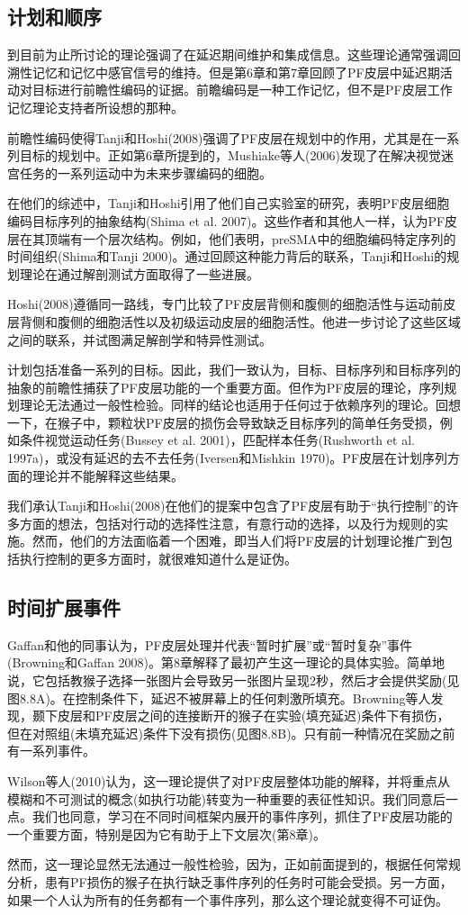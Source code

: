 \subsection{计划和顺序}
到目前为止所讨论的理论强调了在延迟期间维护和集成信息。这些理论通常强调回溯性记忆和记忆中感官信号的维持。但是第6章和第7章回顾了PF皮层中延迟期活动对目标进行前瞻性编码的证据。前瞻编码是一种工作记忆，但不是PF皮层工作记忆理论支持者所设想的那种。
\par 
前瞻性编码使得Tanji和Hoshi(2008)强调了PF皮层在规划中的作用，尤其是在一系列目标的规划中。正如第6章所提到的，Mushiake等人(2006)发现了在解决视觉迷宫任务的一系列运动中为未来步骤编码的细胞。
\par 
在他们的综述中，Tanji和Hoshi引用了他们自己实验室的研究，表明PF皮层细胞编码目标序列的抽象结构(Shima et al. 2007)。这些作者和其他人一样，认为PF皮层在其顶端有一个层次结构。例如，他们表明，preSMA中的细胞编码特定序列的时间组织(Shima和Tanji 2000)。通过回顾这种能力背后的联系，Tanji和Hoshi的规划理论在通过解剖测试方面取得了一些进展。
\par 
Hoshi(2008)遵循同一路线，专门比较了PF皮层背侧和腹侧的细胞活性与运动前皮层背侧和腹侧的细胞活性以及初级运动皮层的细胞活性。他进一步讨论了这些区域之间的联系，并试图满足解剖学和特异性测试。
\par 
计划包括准备一系列的目标。因此，我们一致认为，目标、目标序列和目标序列的抽象的前瞻性捕获了PF皮层功能的一个重要方面。但作为PF皮层的理论，序列规划理论无法通过一般性检验。同样的结论也适用于任何过于依赖序列的理论。回想一下，在猴子中，颗粒状PF皮层的损伤会导致缺乏目标序列的简单任务受损，例如条件视觉运动任务(Bussey et al. 2001)，匹配样本任务(Rushworth et al. 1997a)，或没有延迟的去不去任务(Iversen和Mishkin 1970)。PF皮层在计划序列方面的理论并不能解释这些结果。
\par 
我们承认Tanji和Hoshi(2008)在他们的提案中包含了PF皮层有助于“执行控制”的许多方面的想法，包括对行动的选择性注意，有意行动的选择，以及行为规则的实施。然而，他们的方法面临着一个困难，即当人们将PF皮层的计划理论推广到包括执行控制的更多方面时，就很难知道什么是证伪。
\subsection{时间扩展事件}
Gaffan和他的同事认为，PF皮层处理并代表“暂时扩展”或“暂时复杂”事件(Browning和Gaffan 2008)。第8章解释了最初产生这一理论的具体实验。简单地说，它包括教猴子选择一张图片会导致另一张图片呈现2秒，然后才会提供奖励(见图8.8A)。在控制条件下，延迟不被屏幕上的任何刺激所填充。Browning等人发现，颞下皮层和PF皮层之间的连接断开的猴子在实验(填充延迟)条件下有损伤，但在对照组(未填充延迟)条件下没有损伤(见图8.8B)。只有前一种情况在奖励之前有一系列事件。
\par 
Wilson等人(2010)认为，这一理论提供了对PF皮层整体功能的解释，并将重点从模糊和不可测试的概念(如执行功能)转变为一种重要的表征性知识。我们同意后一点。我们也同意，学习在不同时间框架内展开的事件序列，抓住了PF皮层功能的一个重要方面，特别是因为它有助于上下文层次(第8章)。
\par 
然而，这一理论显然无法通过一般性检验，因为，正如前面提到的，根据任何常规分析，患有PF损伤的猴子在执行缺乏事件序列的任务时可能会受损。另一方面，如果一个人认为所有的任务都有一个事件序列，那么这个理论就变得不可证伪。
